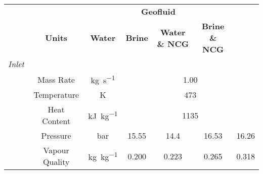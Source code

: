 \begin{tabular}{|p{2em} c | c | c | c | c| c |}
    \hline
    \rowcolor{bluepoli!40}
    \multicolumn{2}{|c|}{} &  & \multicolumn{4}{c|}{\textbf{Geofluid}} \T\B \\
    \rowcolor{bluepoli!40}
    \multicolumn{2}{|c|}{Conditions} & \textbf{Units} & \textbf{Water} & \textbf{Brine} & \textbf{Water \& NCG} & \textbf{Brine \& NCG} \T\B \\
    \hline \hline
    \emph{Inlet} &   & & \multicolumn{4}{c|}{} \T\B\\
     & Mass Rate & \unit{\kg \per \s} & \multicolumn{4}{c|}{1.00} \T\B\\
    & Temperature & \unit{\K} & \multicolumn{4}{c|}{473} \T\B\\
    & Heat Content & \unit{\kilo \joule \per \kg} & \multicolumn{4}{c|}{1135} \T\B\\
    & Pressure & \unit{\bar} & 15.55 & 14.4 & 16.53 & 16.26 \T\B\\
    & Vapour Quality & \unit{\kg \per \kg} & 0.200 & 0.223 & 0.265 & 0.318 \T\B\\
    \hline
\end{tabular}